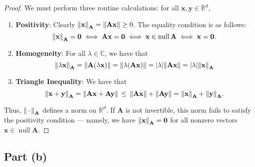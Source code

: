 \documentclass[11pt]{article}
\renewcommand{\vec}[1]{\mathbf{#1}}
\newcommand{\mat}[1]{\mathbf{#1}}
\newcommand{\nll}{\operatorname{null}}
\begin{document}
\begin{proof}
  We must perform three routine calculations: for all $\vec{x}, \vec{y} \in \mathbb{R}^{d}$,
  \begin{enumerate}
    \item \textbf{Positivity}: Clearly $\norm{\vec{x}}_{\mat{A}} = \norm{\mat{A} \vec{x}} \ge 0$. The equality condition is as follows:
    \[
      \norm{\vec{x}}_{\mat{A}} = \vec{0} \iff \mat{A} \vec{x} = \vec{0} \iff \vec{x} \in \nll \mat{A} \iff \vec{x} = \vec{0}.
    \]
    \item \textbf{Homogeneity}: For all $\lambda \in \mathbb{C}$, we have that
    \[
      \norm{\lambda \vec{x}}_{\mat{A}} = \norm{\mat{A} (\lambda \vec{x})} = \norm{\lambda (\mat{A} \vec{x})} = \abs{\lambda} \norm{\mat{A} \vec{x}} = \abs{\lambda} \norm{\vec{x}}_{\mat{A}}
    \]
    \item \textbf{Triangle Inequality}: We have that
    \[
      \norm{\vec{x} + \vec{y}}_{\mat{A}} = \norm{\mat{A} \vec{x} + \mat{A} \vec{y}} \, \le \, \norm{\mat{A} \vec{x}} + \norm{\mat{A} \vec{y}} = \norm{\vec{x}}_{\mat{A}} + \norm{\vec{y}}_{\mat{A}}.
    \]
  \end{enumerate}
  Thus, $\norm{\, \cdot \,}_{\mat{A}}$ defines a norm on $\mathbb{R}^{d}$. If $\mat{A}$ is not invertible, this norm fails to satisfy the positivity condition --- namely, we have $\norm{\vec{x}}_{\mat{A}} = \vec{0}$ for all nonzero vectors $\vec{x} \in \nll \mat{A}$.
\end{proof}


\subsection{Part (b)}
\end{document}
